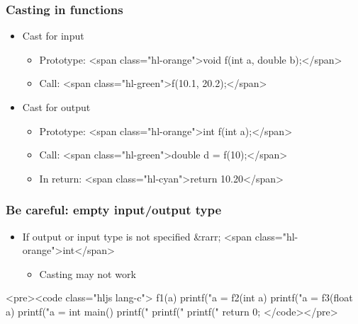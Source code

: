 \documentclass{../c-lecture}
\begin{document}
\begin{frame}
  \frametitle{Casting in functions}
  \begin{itemize}
    \item Cast for input
    \begin{itemize}
      \item
        Prototype: <span class="hl-orange">void f(int a, double b);</span>

      \item Call: <span class="hl-green">f(10.1, 20.2);</span>
    \end{itemize}
    \item Cast for output
    \begin{itemize}
      \item Prototype: <span class="hl-orange">int f(int a);</span>
      \item Call: <span class="hl-green">double d = f(10);</span>
      \item In return: <span class="hl-cyan">return 10.20</span>
    \end{itemize}
  \end{itemize}
\end{frame}
\begin{frame}
  \frametitle{Be careful: empty input/output type}
  \begin{itemize}
    \item
      If output or input type is not specified &rarr;
      <span class="hl-orange">int</span>

    \begin{itemize}
      \item Casting may not work
    \end{itemize}
  \end{itemize}
  <pre><code class="hljs lang-c">
f1(a){
  printf("a = %
}
f2(int a){
  printf("a = %
}
f3(float a){
    printf("a = %
}
int main(){
  printf("%
  printf("%
  printf("%
  return 0;
}
  </code></pre>
\end{frame}
\end{document}
